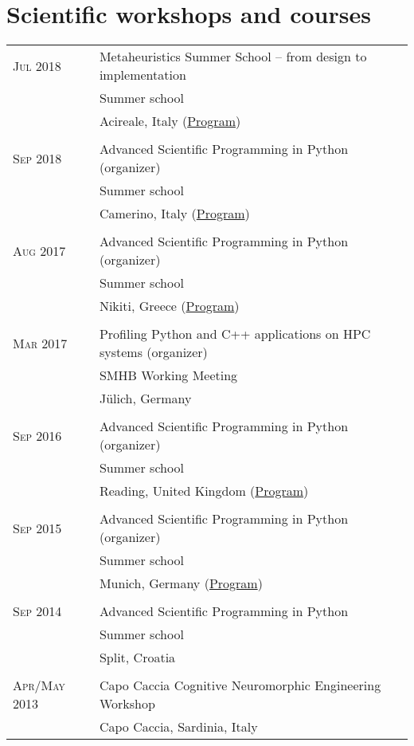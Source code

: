 \section{Scientific workshops and courses}
\begin{longtable}{>{\hfill}p{3.15cm}|p{10.4cm}}
  \textsc{Jul} 2018 & Metaheuristics Summer School -- from design to implementation \\
  & \footnotesize Summer school \\
                    & \footnotesize Acireale, Italy  (\href{https://www.ants-lab.it/mess2018/}{Program}) \\
  \multicolumn{2}{c}{} \\
  \textsc{Sep} 2018 & Advanced Scientific Programming in Python (organizer) \\
  & \footnotesize Summer school \\
  & \footnotesize Camerino, Italy  (\href{https://python.g-node.org/python-summerschool-2018/}{Program}) \\
  \multicolumn{2}{c}{} \\
  \textsc{Aug} 2017 & Advanced Scientific Programming in Python (organizer) \\
    & \footnotesize Summer school \\
                    & \footnotesize Nikiti, Greece  (\href{https://python.g-node.org/python-summerschool-2017/}{Program}) \\
  \multicolumn{2}{c}{} \\
  \textsc{Mar} 2017 & Profiling Python and C++ applications on HPC systems (organizer) \\
                    & \footnotesize SMHB Working Meeting \\
                    & \footnotesize J\"ulich, Germany \\
  \multicolumn{2}{c}{} \\
  \textsc{Sep} 2016 & Advanced Scientific Programming in Python (organizer)\\
  & \footnotesize Summer school \\
                    &  \footnotesize Reading, United Kingdom (\href{https://python.g-node.org/python-summerschool-2016/schedule.html}{Program}) \\
  \multicolumn{2}{c}{} \\
  \textsc{Sep} 2015 & Advanced Scientific Programming in Python (organizer)\\
  & \footnotesize Summer school \\
  & \footnotesize Munich, Germany (\href{https://python.g-node.org/python-summerschool-2015/schedule.html}{Program})\\
  \multicolumn{2}{c}{} \\
  \textsc{Sep} 2014 & Advanced Scientific Programming in Python \\
  & \footnotesize Summer school \\
  & \footnotesize Split, Croatia \\
  \multicolumn{2}{c}{} \\
  \textsc{Apr}/\textsc{May} 2013 & Capo Caccia Cognitive Neuromorphic Engineering Workshop \\
  & \footnotesize Capo Caccia, Sardinia, Italy
\end{longtable}
